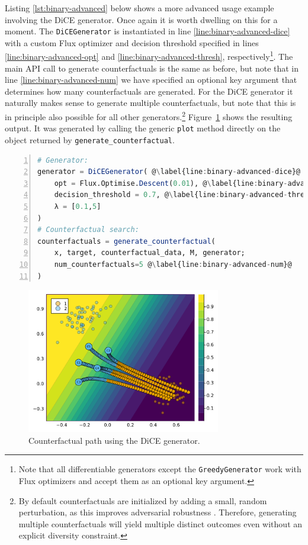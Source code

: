 \documentclass{juliacon}
\begin{document}
Listing \ref{lst:binary-advanced} below shows a more advanced usage
example involving the DiCE generator. Once again it is worth dwelling on
this for a moment. The \texttt{DiCEGenerator} is instantiated in line
\ref{line:binary-advanced-dice} with a custom Flux optimizer and
decision threshold specified in lines \ref{line:binary-advanced-opt} and
\ref{line:binary-advanced-thresh}, respectively\footnote{Note that all
  differentiable generators except the \texttt{GreedyGenerator} work
  with Flux optimizers and accept them as an optional key argument.}.
The main API call to generate counterfactuals is the same as before, but
note that in line \ref{line:binary-advanced-num} we have specified an
optional key argument that determines how many counterfactuals are
generated. For the DiCE generator it naturally makes sense to generate
multiple counterfactuals, but note that this is in principle also
possible for all other generators.\footnote{By default counterfactuals
  are initialized by adding a small, random perturbation, as this
  improves adversarial robustness \cite{slack2021counterfactual}.
  Therefore, generating multiple counterfactuals will yield multiple
  distinct outcomes even without an explicit diversity constraint.}
Figure~\ref{fig-binary-advanced} shows the resulting output. It was
generated by calling the generic \texttt{plot} method directly on the
object returned by \texttt{generate\_counterfactual}.

\begin{lstlisting}[language=Julia, escapechar=@, numbers=left, label={lst:binary-advanced}, caption={}]
# Generator:
generator = DiCEGenerator( @\label{line:binary-advanced-dice}@
    opt = Flux.Optimise.Descent(0.01), @\label{line:binary-advanced-opt}@
    decision_threshold = 0.7, @\label{line:binary-advanced-thresh}@
    λ = [0.1,5]
)
# Counterfactual search:
counterfactuals = generate_counterfactual(
    x, target, counterfactual_data, M, generator;
    num_counterfactuals=5 @\label{line:binary-advanced-num}@
)
\end{lstlisting}

\begin{figure}

{\centering \includegraphics[width=3.33333in,height=2.5in]{www/binary_advanced.png}

}

\caption{\label{fig-binary-advanced}Counterfactual path using the DiCE
generator.}

\end{figure}
\end{document}
